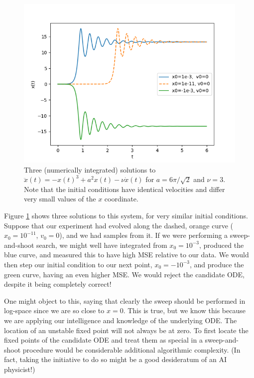 \documentclass{article}
\begin{document}
\begin{figure}
\includegraphics{images/alternative_methods/double_well.png}
\centering
\caption{
Three (numerically integrated) solutions to $\ddot{x}(t) = -x(t)^3 + a^2 x(t) - \nu \dot{x}(t)$ for $a = 6\pi / \sqrt{2}$ and $\nu = 3$.
Note that the initial conditions have identical velocities and differ very small values of the $x$ coordinate.
}
\label{fig:double_well}
\end{figure}

Figure \ref{fig:double_well} shows three solutions to this system, for very similar initial conditions.
Suppose that our experiment had evolved along the dashed, orange curve ($x_0 = 10^{-11}$, $v_0 = 0$), and we had samples from it.
If we were performing a sweep-and-shoot search, we might well have integrated from $x_0 = 10^{-3}$, produced the blue curve, and measured this to have high MSE relative to our data.
We would then step our initial condition to our next point, $x_0 = -10^{-3}$, and produce the green curve, having an even higher MSE.
We would reject the candidate ODE, despite it being completely correct!

One might object to this, saying that clearly the sweep should be performed in log-space since we are so close to $x=0$.
This is true, but we know this because we are applying our intelligence and knowledge of the underlying ODE.
The location of an unstable fixed point will not always be at zero.
To first locate the fixed points of the candidate ODE and treat them as special in a sweep-and-shoot procedure would be considerable additional algorithmic complexity.
(In fact, taking the initiative to do so might be a good desideratum of an AI physicist!)
\end{document}
